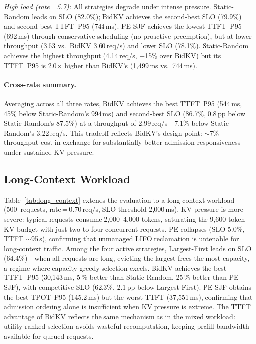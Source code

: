 \documentclass[sigconf,nonacm]{acmart}
\newcommand{\bidkv}{BidKV\xspace}
\begin{document}
\emph{High load (rate\,=\,5.7):}
All strategies degrade under intense pressure.  Static-Random leads on SLO
(82.0\%); \bidkv achieves the second-best SLO (79.9\%) and second-best
TTFT~P95 (744\,ms).  PE-SJF achieves the lowest TTFT~P95 (692\,ms) through
conservative scheduling (no proactive preemption), but at lower throughput
(3.53 vs.\ \bidkv 3.60\,req/s) and lower SLO (78.1\%).
Static-Random achieves the highest throughput (4.14\,req/s, $+$15\% over
\bidkv) but its TTFT~P95 is 2.0$\times$ higher than \bidkv's
(1{,}499\,ms vs.~744\,ms).

\paragraph{Cross-rate summary.}
Averaging across all three rates, \bidkv achieves the best TTFT~P95
(544\,ms, 45\% below Static-Random's 994\,ms) and second-best SLO (86.7\%,
0.8\,pp below Static-Random's 87.5\%) at a throughput of
2.99\,req/s---7.1\% below Static-Random's 3.22\,req/s.  This tradeoff
reflects \bidkv's design point: ${\sim}$7\% throughput cost in exchange for
substantially better admission responsiveness under sustained KV pressure.

\subsection{Long-Context Workload}\label{sec:eval:long}



Table~\ref{tab:long_context} extends the evaluation to a long-context workload
(500~requests, rate\,=\,0.70\,req/s, SLO threshold 2{,}000\,ms).
KV pressure is more severe: typical requests consume 2{,}000--4{,}000
tokens, saturating the 9{,}600-token KV budget with just two to four
concurrent requests.
PE collapses (SLO 5.0\%, TTFT ${\sim}$95\,s), confirming that
unmanaged LIFO reclamation is untenable for long-context traffic.
Among the four active strategies, Largest-First leads on SLO
(64.4\%)---when all requests are long, evicting the largest frees
the most capacity, a regime where capacity-greedy selection excels.
\bidkv achieves the best TTFT~P95 (30{,}143\,ms, 5\,\% better than
Static-Random, 25\,\% better than PE-SJF), with competitive SLO
(62.3\%, 2.1\,pp below Largest-First).
PE-SJF obtains the best TPOT~P95 (145.2\,ms) but the worst TTFT
(37{,}551\,ms), confirming that admission ordering alone is
insufficient when KV pressure is extreme.
The TTFT advantage of \bidkv reflects the same mechanism as in the
mixed workload: utility-ranked selection avoids wasteful recomputation,
keeping prefill bandwidth available for queued requests.
\end{document}
